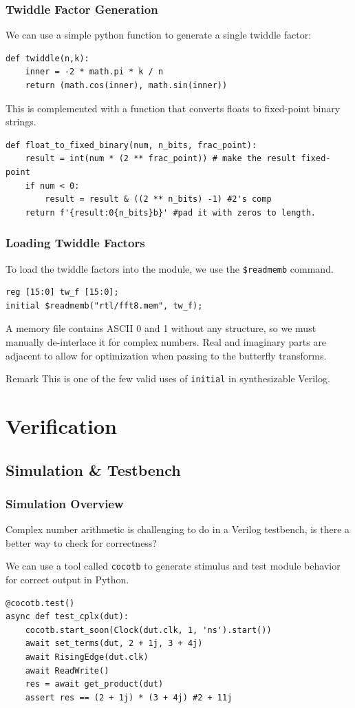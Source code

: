 \documentclass{beamer}
\begin{document}
\begin{frame}[fragile]
	\frametitle{Twiddle Factor Generation}
	We can use a simple python function to generate a single twiddle factor:
\begin{verbatim}
def twiddle(n,k):
    inner = -2 * math.pi * k / n
    return (math.cos(inner), math.sin(inner))
\end{verbatim}
This is complemented with a function that converts floats to fixed-point binary strings.
\begin{verbatim}
def float_to_fixed_binary(num, n_bits, frac_point):
    result = int(num * (2 ** frac_point)) # make the result fixed-point
    if num < 0:
        result = result & ((2 ** n_bits) -1) #2's comp
    return f'{result:0{n_bits}b}' #pad it with zeros to length.
\end{verbatim}
\end{frame}

\begin{frame}[fragile]
	\frametitle{Loading Twiddle Factors}
	To load the twiddle factors into the module, we use the \texttt{\$readmemb}
	command.
\begin{verbatim}
reg [15:0] tw_f [15:0];
initial $readmemb("rtl/fft8.mem", tw_f);
\end{verbatim}
\pause
A memory file contains ASCII 0 and 1 without any structure, so we must manually
de-interlace it for complex numbers. Real and imaginary parts are adjacent to
allow for optimization when passing to the butterfly transforms.

\pause
\begin{block}{Remark}
	This is one of the few valid uses of \texttt{initial} in synthesizable
	Verilog.
\end{block}
\end{frame}

\section{Verification}

\subsection{Simulation \& Testbench}
\begin{frame}[fragile]
	\frametitle{Simulation Overview}
	Complex number arithmetic is challenging to do in a Verilog testbench,
	is there a better way to check for correctness?

	\pause
	 We can use a tool called \texttt{cocotb} to generate stimulus and
	test module behavior for correct output in Python.

\begin{verbatim}
@cocotb.test()
async def test_cplx(dut):
    cocotb.start_soon(Clock(dut.clk, 1, 'ns').start())
    await set_terms(dut, 2 + 1j, 3 + 4j)
    await RisingEdge(dut.clk)
    await ReadWrite()
    res = await get_product(dut)
    assert res == (2 + 1j) * (3 + 4j) #2 + 11j
\end{verbatim}
\end{frame}
\end{document}
